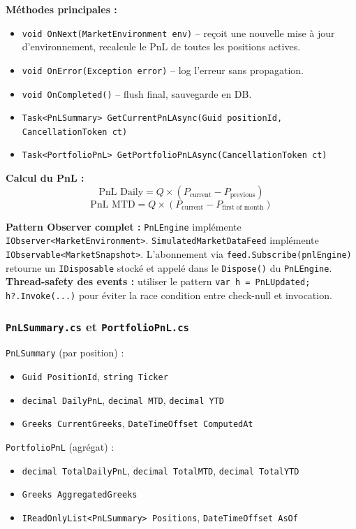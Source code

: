 \documentclass[a4paper,11pt]{article}
\newcommand{\cs}[1]{\texttt{\color{codeinline}#1}}
\begin{document}
\textbf{M\'ethodes principales :}
\begin{itemize}[leftmargin=1.5em]
  \item \cs{void OnNext(MarketEnvironment env)} -- re\c{c}oit une nouvelle mise \`a jour
        d'environnement, recalcule le PnL de toutes les positions actives.
  \item \cs{void OnError(Exception error)} -- log l'erreur sans propagation.
  \item \cs{void OnCompleted()} -- flush final, sauvegarde en DB.
  \item \cs{Task<PnLSummary> GetCurrentPnLAsync(Guid positionId, CancellationToken ct)}
  \item \cs{Task<PortfolioPnL> GetPortfolioPnLAsync(CancellationToken ct)}
\end{itemize}

\textbf{Calcul du PnL :}
\[
  \text{PnL Daily} = Q \times (P_{\text{current}} - P_{\text{previous}})
\]
\[
  \text{PnL MTD} = Q \times (P_{\text{current}} - P_{\text{first of month}})
\]

\begin{tcolorbox}[constraint]
\textbf{Pattern Observer complet :} \cs{PnLEngine} impl\'emente \cs{IObserver<MarketEnvironment>}.
\cs{SimulatedMarketDataFeed} impl\'emente \cs{IObservable<MarketSnapshot>}. L'abonnement
via \cs{feed.Subscribe(pnlEngine)} retourne un \cs{IDisposable} stock\'e et appel\'e
dans le \cs{Dispose()} du \cs{PnLEngine}.\\[4pt]
\textbf{Thread-safety des events :} utiliser le pattern \cs{var h = PnLUpdated; h?.Invoke(...)}
pour \'eviter la race condition entre check-null et invocation.
\end{tcolorbox}

\subsubsection{\texttt{PnLSummary.cs} et \texttt{PortfolioPnL.cs}}

\cs{PnLSummary} (par position) :
\begin{itemize}[leftmargin=1.5em]
  \item \cs{Guid PositionId}, \cs{string Ticker}
  \item \cs{decimal DailyPnL}, \cs{decimal MTD}, \cs{decimal YTD}
  \item \cs{Greeks CurrentGreeks}, \cs{DateTimeOffset ComputedAt}
\end{itemize}

\cs{PortfolioPnL} (agr\'egat) :
\begin{itemize}[leftmargin=1.5em]
  \item \cs{decimal TotalDailyPnL}, \cs{decimal TotalMTD}, \cs{decimal TotalYTD}
  \item \cs{Greeks AggregatedGreeks}
  \item \cs{IReadOnlyList<PnLSummary> Positions}, \cs{DateTimeOffset AsOf}
\end{itemize}
\end{document}
